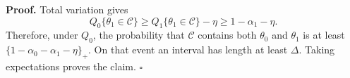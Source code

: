 \textbf{Proof.}
Total variation gives
\[
Q_0\{\theta_1\in\mathcal C\}
\ge Q_1\{\theta_1\in\mathcal C\}-\eta
\ge1-\alpha_1-\eta.
\]
Therefore, under \(Q_0\), the probability that \(\mathcal C\) contains both \(\theta_0\) and \(\theta_1\) is at least \(\{1-\alpha_0-\alpha_1-\eta\}_+\). On that event an interval has length at least \(\Delta\). Taking expectations proves the claim. \(\square\)